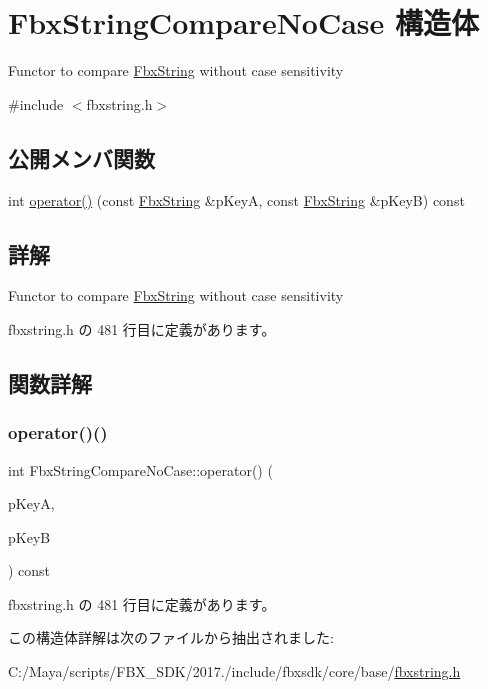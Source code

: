 \hypertarget{struct_fbx_string_compare_no_case}{}\section{Fbx\+String\+Compare\+No\+Case 構造体}
\label{struct_fbx_string_compare_no_case}


Functor to compare \hyperlink{class_fbx_string}{Fbx\+String} without case sensitivity  




{\ttfamily \#include $<$fbxstring.\+h$>$}

\subsection*{公開メンバ関数}
\begin{DoxyCompactItemize}
\item 
int \hyperlink{struct_fbx_string_compare_no_case_a36f7111fa137dead21e47a154133c188}{operator()} (const \hyperlink{class_fbx_string}{Fbx\+String} \&p\+KeyA, const \hyperlink{class_fbx_string}{Fbx\+String} \&p\+KeyB) const
\end{DoxyCompactItemize}


\subsection{詳解}
Functor to compare \hyperlink{class_fbx_string}{Fbx\+String} without case sensitivity 

 fbxstring.\+h の 481 行目に定義があります。



\subsection{関数詳解}
\mbox{\label{struct_fbx_string_compare_no_case_a36f7111fa137dead21e47a154133c188}} 
\subsubsection{\texorpdfstring{operator()()}{operator()()}}
{\footnotesize\ttfamily int Fbx\+String\+Compare\+No\+Case\+::operator() (\begin{DoxyParamCaption}\item[{const \hyperlink{class_fbx_string}{Fbx\+String} \&}]{p\+KeyA,  }\item[{const \hyperlink{class_fbx_string}{Fbx\+String} \&}]{p\+KeyB }\end{DoxyParamCaption}) const\hspace{0.3cm}{\ttfamily [inline]}}



 fbxstring.\+h の 481 行目に定義があります。



この構造体詳解は次のファイルから抽出されました\+:\begin{DoxyCompactItemize}
\item 
C\+:/\+Maya/scripts/\+F\+B\+X\+\_\+\+S\+D\+K/2017./include/fbxsdk/core/base/\hyperlink{fbxstring_8h}{fbxstring.\+h}\end{DoxyCompactItemize}
